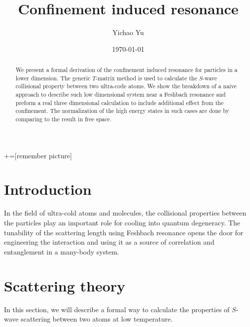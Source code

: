 \documentclass[aps,twocolumn,secnumarabic,balancelastpage,amsmath,amssymb,nofootinbib]{revtex4}
\begin{document}
+=[remember picture]
\title{Confinement induced resonance}
\author{Yichao Yu}
\date{\today}

\begin{abstract}
  We present a formal derivation of the confinement induced resonance for particles in a lower dimension. The generic $T$-matrix method is used to calculate the $S$-wave collisional property between two ultra-code atoms. We show the breakdown of a naive approach to describe such low dimensional system near a Feshbach resonance and preform a real three dimensional calculation to include additional effect from the confinement. The normalization of the high energy states in such cases are done by comparing to the result in free space.
\end{abstract}

\maketitle
\section{Introduction}
In the field of ultra-cold atoms and molecules, the collisional properties between the particles play an important role for cooling into quantum degeneracy. The tunability of the scattering length using Feshbach resonance opens the door for engineering the interaction and using it as a source of correlation and entanglement in a many-body system.


\section{Scattering theory}
In this section, we will describe a formal way to calculate the properties of $S$-wave scattering between two atoms at low temperature.
\end{document}
